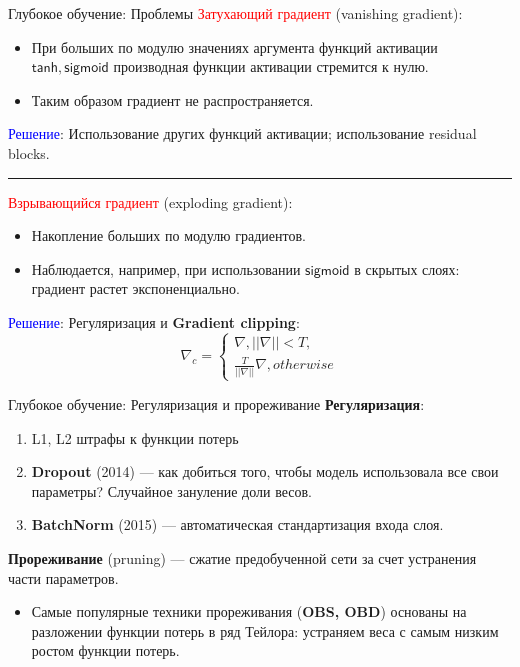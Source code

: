 \documentclass[handout]{beamer}
\begin{document}
\begin{frame}{Глубокое обучение: Проблемы}
	\textcolor{red}{Затухающий градиент} (vanishing gradient):
	\begin{itemize}
		\item При больших по модулю значениях аргумента функций активации $\mathsf{tanh}, \mathsf{sigmoid}$ производная функции активации стремится к нулю. 
		\item Таким образом градиент не распространяется.
	\end{itemize}
	
	\textcolor{blue}{Решение}: Использование других функций активации; использование residual blocks.

	\par\noindent\rule{\textwidth}{0.5pt}

	\textcolor{red}{Взрывающийся градиент} (exploding gradient):
	\begin{itemize}
		\item Накопление больших по модулю градиентов. 
		\item Наблюдается, например, при использовании $\mathsf{sigmoid}$ в скрытых слоях: градиент растет экспоненциально.
	\end{itemize}

	\textcolor{blue}{Решение}: Регуляризация и \textbf{Gradient clipping}:
	\begin{equation*}
		\nabla_{c} = \begin{cases}
		\nabla, ||\nabla|| < T,\\
		\frac{T}{||\nabla||}\nabla, otherwise
	\end{cases}
	\end{equation*}

\end{frame}

\begin{frame}{Глубокое обучение: Регуляризация и прореживание}
	\textbf{Регуляризация}:
	\begin{enumerate}
		\item L1, L2 штрафы к функции потерь
		\item \textbf{Dropout} (2014) --- как добиться того, чтобы модель использовала все свои параметры? Случайное зануление доли весов.
		\item \textbf{BatchNorm} (2015) --- автоматическая стандартизация входа слоя.
	\end{enumerate}
	\textbf{Прореживание} (pruning) --- сжатие предобученной сети за счет устранения части параметров.
	\begin{itemize}
		\item Самые популярные техники прореживания (\textbf{OBS, OBD}) основаны на разложении функции потерь в ряд Тейлора: устраняем веса с самым низким ростом функции потерь.
	\end{itemize}
\end{frame}
\end{document}
